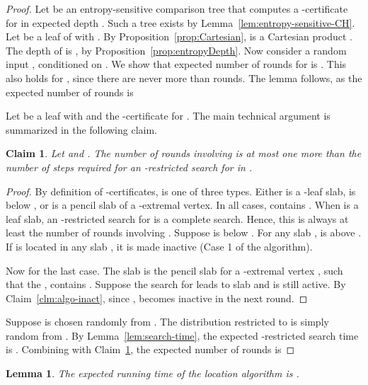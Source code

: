\documentclass[letterpaper,11pt]{article}
\newtheorem{lemma}[theorem]{Lemma}
\newtheorem{claim}[theorem]{Claim}
\begin{document}
\begin{proof} 
Let  be an entropy-sensitive 
comparison tree that 
computes a -certificate for 
 in expected depth . 
Such a tree exists by 
Lemma~\ref{lem:entropy-sensitive-CH}.
Let  be a leaf of  with 
. By 
Proposition~\ref{prop:Cartesian},
 is a Cartesian product 
.
The depth of  is 
, 
by Proposition~\ref{prop:entropyDepth}. 
Now consider a random input , 
conditioned on . We 
show that expected number of rounds 
for  is  . This
also holds for , since
there are never more than  rounds.
The lemma follows, as the 
expected number of rounds is

Let  be a leaf with  and  the 
-certificate for 
. The main technical argument is 
summarized in the following claim.

\begin{claim}\label{clm:algoCH} 
  Let  and
  . The number 
  of rounds involving 
   is at most one more than 
  the number of steps required for an
  -restricted search for 
   in .
\end{claim}

\begin{proof} 
By definition of -certificates, 
 is one of three types. 
Either  is a -leaf slab, 
 is below ,
or  is a pencil slab of a 
-extremal vertex. 
In all cases,  contains .
When  is a leaf slab, an
-restricted search for  is 
a complete search. Hence, this is 
always at least the number of rounds 
involving .
Suppose  is below . 
For any slab ,
 is above . 
If  is located in any slab ,
it is made inactive (Case 1 of the algorithm). 

Now for the last case. 
The slab  is the pencil slab 
for a -extremal vertex ,
such that the , contains . 
Suppose the search for  leads to 
slab  and 
is still active.
By Claim~\ref{clm:algo-inact}, since 
,  becomes
inactive in the next round.
\end{proof}

Suppose  is chosen randomly from 
. The distribution restricted 
to  is simply random from .  
By Lemma~\ref{lem:search-time}, the 
expected -restricted search 
time is . Combining 
with Claim~\ref{clm:algoCH}, the expected
number of rounds is 

\end{proof}

\begin{lemma} 
  The expected running time of 
  the location algorithm is 
  .
\end{lemma}
\end{document}
